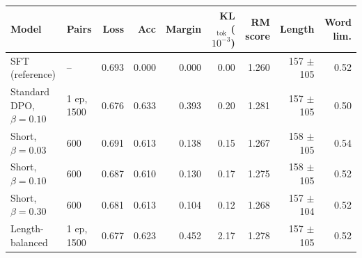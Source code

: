 \begin{tabular}{llrrrrrrr}
\toprule
Model & Pairs & Loss & Acc & Margin & KL$_\text{tok}$ ($10^{-3}$) & RM score & Length & Word lim. \\
\midrule
SFT (reference) & -- & 0.693 & 0.000 & 0.000 & 0.00 & 1.260 & 157 $\pm$ 105 & 0.52 \\
Standard DPO, $\beta{=}0.10$ & 1 ep, 1500 & 0.676 & 0.633 & 0.393 & 0.20 & 1.281 & 157 $\pm$ 105 & 0.50 \\
\midrule
Short, $\beta{=}0.03$ & 600 & 0.691 & 0.613 & 0.138 & 0.15 & 1.267 & 158 $\pm$ 105 & 0.54 \\
Short, $\beta{=}0.10$ & 600 & 0.687 & 0.610 & 0.130 & 0.17 & 1.275 & 158 $\pm$ 105 & 0.52 \\
Short, $\beta{=}0.30$ & 600 & 0.681 & 0.613 & 0.104 & 0.12 & 1.268 & 157 $\pm$ 104 & 0.52 \\
\midrule
Length-balanced & 1 ep, 1500 & 0.677 & 0.623 & 0.452 & 2.17 & 1.278 & 157 $\pm$ 105 & 0.52 \\
\bottomrule
\end{tabular}
